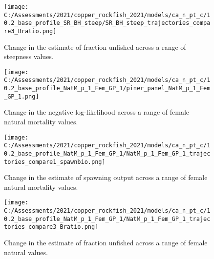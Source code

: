 \documentclass[11pt,
  english,
  a4paper,
]{article}
\begin{document}
\tagmcend\tagstructend


\begin{figure}
\centering
\texttt{[image: C:/Assessments/2021/copper\_rockfish\_2021/models/ca\_n\_pt\_c/10.2\_base\_profile\_SR\_BH\_steep/SR\_BH\_steep\_trajectories\_compare3\_Bratio.png]}
\caption{Change in the estimate of fraction unfished across a range of steepness values.\label{fig:h-depl}}
\end{figure}

\tagmcend\tagstructend


\begin{figure}
\centering
\texttt{[image: C:/Assessments/2021/copper\_rockfish\_2021/models/ca\_n\_pt\_c/10.2\_base\_profile\_NatM\_p\_1\_Fem\_GP\_1/piner\_panel\_NatM\_p\_1\_Fem\_GP\_1.png]}
\caption{Change in the negative log-likelihood across a range of female natural mortality values.\label{fig:m-profile}}
\end{figure}

\tagmcend\tagstructend


\begin{figure}
\centering
\texttt{[image: C:/Assessments/2021/copper\_rockfish\_2021/models/ca\_n\_pt\_c/10.2\_base\_profile\_NatM\_p\_1\_Fem\_GP\_1/NatM\_p\_1\_Fem\_GP\_1\_trajectories\_compare1\_spawnbio.png]}
\caption{Change in the estimate of spawning output across a range of female natural mortality values.\label{fig:m-ssb}}
\end{figure}

\tagmcend\tagstructend


\begin{figure}
\centering
\texttt{[image: C:/Assessments/2021/copper\_rockfish\_2021/models/ca\_n\_pt\_c/10.2\_base\_profile\_NatM\_p\_1\_Fem\_GP\_1/NatM\_p\_1\_Fem\_GP\_1\_trajectories\_compare3\_Bratio.png]}
\caption{Change in the estimate of fraction unfished across a range of female natural values.\label{fig:m-depl}}
\end{figure}
\end{document}
